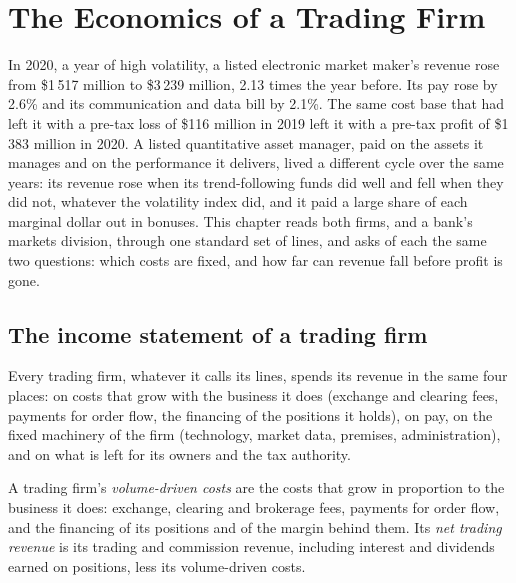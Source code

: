 \chapter{The Economics of a Trading Firm}\label{ch:fm:the-economics-of-a-trading-firm}

In 2020, a year of high volatility, a listed electronic market maker's revenue rose from \$1\,517 million to \$3\,239 million, 2.13 times the year
before. Its pay rose by 2.6\% and its communication and data bill by 2.1\%. The same cost base that had left it with a pre-tax loss of \$116 million
in 2019 left it with a pre-tax profit of \$1\,383 million in 2020. A listed quantitative asset manager, paid on the assets it manages and on the
performance it delivers, lived a different cycle over the same years: its revenue rose when its trend-following funds did well and fell when they
did not, whatever the volatility index did, and it paid a large share of each marginal dollar out in bonuses. This chapter reads both firms, and a
bank's markets division, through one standard set of lines, and asks of each the same two questions: which costs are fixed, and how far can
revenue fall before profit is gone.

\section{The income statement of a trading firm}

Every trading firm, whatever it calls its lines, spends its revenue in the same four places: on costs that grow with the business it does (exchange
and clearing fees, payments for order flow, the financing of the positions it holds), on pay, on the fixed machinery of the firm (technology,
market data, premises, administration), and on what is left for its owners and the tax authority.

\begin{definition}\label{def:fm:the-economics-of-a-trading-firm:ntr}
A trading firm's \emph{volume-driven costs} are the costs that grow in proportion to the business it does: exchange,
clearing and brokerage fees, payments for order flow, and the financing of its positions and of the margin behind them. Its \emph{net trading
revenue} is its trading and commission revenue, including interest and dividends earned on positions, less its
volume-driven costs.
\end{definition}

